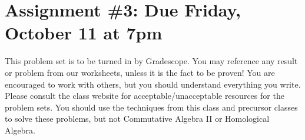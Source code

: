 \documentclass[12pt]{amsart}
\newcommand{\showsol}[1]{\def\displaysol{#1}}
\begin{document}
\showsol{1}
	
	\thispagestyle{empty}
	
	\section*{Assignment \#3: Due Friday, October 11 at 7pm}
	
	This problem set is to be turned in by Gradescope. You may reference any result or problem from our worksheets, unless it is the fact to be proven! You are encouraged to work with others, but you should understand everything you write. Please consult the class website for acceptable/unacceptable resources for the problem sets. You should use the techniques from this class and precursor classes to solve these problems, but not Commutative Algebra II or Homological Algebra. 
	
	\
	
	
	
\end{document}
